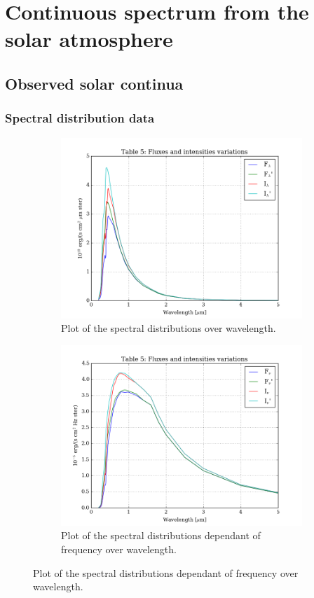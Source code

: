 \documentclass[11pt,a4paper,notitlepage]{article}
\begin{document}
\section{Continuous spectrum from the solar atmosphere} 				%

\subsection{Observed solar continua}

\subsubsection{Spectral distribution data}
\begin{figure}[H]
\center

	\begin{subfigure}{0.49\textwidth}
	\includegraphics[scale=0.42]{../figs/2obs_sol_cont.png}
	\caption{Plot of the spectral distributions over wavelength.}
	\end{subfigure}
	\hfill
	\begin{subfigure}{0.49\textwidth}
	\includegraphics[scale=0.42]{../figs/2obs_sol_cont_freq.png}
	\caption{Plot of the spectral distributions dependant of frequency over wavelength.}
	\end{subfigure}


\end{figure}
\end{document}

